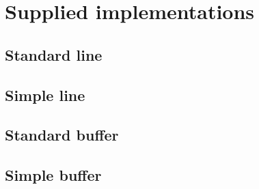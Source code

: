 \chapter{Supplied implementations}
\label{chap-supplied-implementations}

\section{Standard line}

\section{Simple line}

\section{Standard buffer}

\section{Simple buffer}
